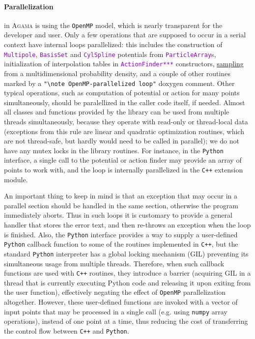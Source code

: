 \documentclass[12pt]{article}
\newcommand{\Agama}{\textsc{Agama}\xspace}
\newcommand{\Cpp}  {\texttt{C++}\xspace}
\newcommand{\Python}{\texttt{Python}\xspace}
\newcommand{\ttt}[1]{\textcolor{darkviolet}{\texttt{#1}}}
\let\oldparagraph\paragraph
\renewcommand{\paragraph}[1]{\vspace{-2mm}\oldparagraph{#1}}
\begin{document}
\paragraph{Parallelization}  in \Agama is using the \texttt{OpenMP} model, which is nearly transparent for the developer and user. Only a few operations that are supposed to occur in a serial context have internal loops parallelized: this includes the construction of \ttt{Multipole}, \ttt{BasisSet} and \ttt{CylSpline} potentials from \ttt{ParticleArray}s, initialization of interpolation tables in \ttt{ActionFinder***} constructors, \hyperref[sec:Sampling]{sampling} from a multidimensional probability density, and a couple of other routines marked by a \texttt{"\textbackslash note OpenMP-parallelized loop"} doxygen comment. 
Other typical operations, such as computation of potential or action for many points simultaneously, should be paralellized in the caller code itself, if needed. Almost all classes and functions provided by the library can be used from multiple threads simultaneously, because they operate with read-only or thread-local data (exceptions from this rule are linear and quadratic optimization routines, which are not thread-safe, but hardly would need to be called in parallel); we do not have any mutex locks in the library routines.
For instance, in the \Python interface, a single call to the potential or action finder may provide an array of points to work with, and the loop is internally parallelized in the \Cpp extension module. 

An important thing to keep in mind is that an exception that may occur in a parallel section should be handled in the same section, otherwise the program immediately aborts. Thus in such loops it is customary to provide a general handler that stores the error text, and then re-throws an exception when the loop is finished.
Also, the \Python interface provides a way to supply a user-defined \Python callback function to some of the routines implemented in \Cpp, but the standard \Python interpreter has a global locking mechanism (GIL) preventing its simultaneous usage from multiple threads. Therefore, when such callback functions are used with \Cpp routines, they introduce a barrier (acquiring GIL in a thread that is currently executing Python code and releasing it upon exiting from the user function), effectively negating the effect of \texttt{OpenMP} parallelization altogether. However, these user-defined functions are invoked with a vector of input points that may be processed in a single call (e.g. using \texttt{numpy} array operations), instead of one point at a time, thus reducing the cost of transferring the control flow between \Cpp and \Python.
\end{document}
